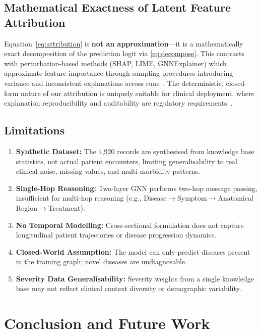 \documentclass[conference]{IEEEtran}
\begin{document}
\subsection{Mathematical Exactness of Latent Feature Attribution}

Equation~\eqref{eq:attribution} is \textbf{not an approximation}---it
is a mathematically exact decomposition of the prediction logit via
\eqref{eq:decompose}. This contrasts with perturbation-based methods
(SHAP, LIME, GNNExplainer) which approximate feature importance through
sampling procedures introducing variance and inconsistent explanations
across runs~\cite{yuan2023explainability,luo2020parameterized}. The
deterministic, closed-form nature of our attribution is uniquely
suitable for clinical deployment, where explanation reproducibility
and auditability are regulatory requirements~\cite{amann2020explainability}.

\subsection{Limitations}

\begin{enumerate}
  \item \textbf{Synthetic Dataset:} The 4,920 records are synthesised
        from knowledge base statistics, not actual patient encounters,
        limiting generalisability to real clinical noise, missing
        values, and multi-morbidity patterns.
  \item \textbf{Single-Hop Reasoning:} Two-layer GNN performs two-hop
        message passing, insufficient for multi-hop reasoning
        (e.g., Disease$\to$Symptom$\to$Anatomical Region$\to$Treatment).
  \item \textbf{No Temporal Modelling:} Cross-sectional formulation
        does not capture longitudinal patient trajectories or disease
        progression dynamics.
  \item \textbf{Closed-World Assumption:} The model can only predict
        diseases present in the training graph; novel diseases are
        undiagnosable.
  \item \textbf{Severity Data Generalisability:} Severity weights from
        a single knowledge base may not reflect clinical context
        diversity or demographic variability.
\end{enumerate}

\section{Conclusion and Future Work}
\label{sec:conclusion}
\end{document}
